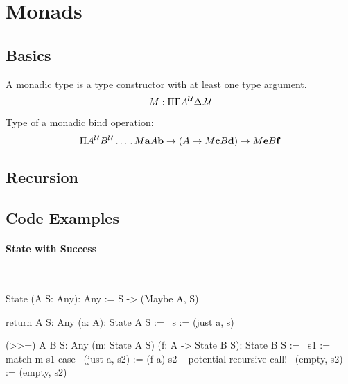 \section{Monads}





\subsection{Basics}




A monadic type is a type constructor with at least one type argument.
$$
    M: \Pi \Gamma A^{\cal U} \Delta. {\cal U}
$$

Type of a monadic bind operation:
$$
    \Pi A^{\cal U} B^{\cal U} \ldots \,.\,
    M {\mathbf a} A {\mathbf b}
    \to
    (A \to M {\mathbf c} B {\mathbf d})
    \to
    M {\mathbf e} B {\mathbf f}
$$






\subsection{Recursion}







\subsection{Code Examples}




\paragraph{State with Success}

\ \begin{alba}
    State (A S: Any): Any :=
        S -> (Maybe A, S)

    return {A S: Any} (a: A): State A S :=
        \ s := (just a, s)

    (>>=) {A B S: Any} (m: State A S) (f: A -> State B S): State B S :=
        \ s1 :=
            match m s1 case
                \ (just a, s2) :=  (f a) s2     -- potential recursive call!
                \ (empty,  s2) :=  (empty, s2)
\end{alba}




